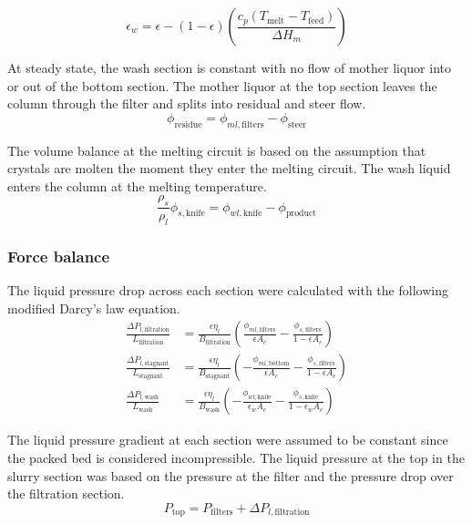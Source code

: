 \begin{equation}
\epsilon_{w}= \epsilon-(1-\epsilon)\left(\frac{c_p(T_{\mathrm{melt}}-T_{\mathrm{feed}})}{\Delta H_m}\right)
\end{equation}

At steady state, the wash section is constant with no flow of mother liquor into or out of the bottom section. The mother liquor at the top section leaves the column through the filter and splits into residual and steer flow. 
\begin{equation}
\phi_{\mathrm{residue}}= \phi_{ml,\mathrm{filters}} - \phi_{\mathrm{steer}}
\end{equation}

The volume balance at the melting circuit is based on the assumption that crystals are molten the moment they enter the melting circuit. The wash liquid enters the column at the melting temperature. 
\begin{equation}
\frac{\rho_s}{\rho_l}\phi_{s,\mathrm{knife}}= \phi_{wl,\mathrm{knife}} - \phi_{\mathrm{product}}
\end{equation}


\subsubsection{Force balance}
The liquid pressure drop across each section were calculated with the following modified Darcy's law equation. 
\begin{align}
    \frac{\Delta P_{l,\mathrm{filtration}}}{L_{\mathrm{filtration}}} &= \frac{\epsilon \eta_{l}}{B_{\mathrm{filtration}}}\left(\frac{\phi_{ml,\mathrm{filters}}}{\epsilon A_c} - \frac{\phi_{s,\mathrm{filters}}}{1-\epsilon A_c}\right) \\
    \frac{\Delta P_{l,\mathrm{stagnant}}}{L_{\mathrm{stagnant}}} &= \frac{\epsilon \eta_{l}}{B_{\mathrm{stagnant}}}\left(-\frac{\phi_{ml,\mathrm{bottom}}}{\epsilon A_c} - \frac{\phi_{s,\mathrm{filters}}}{1-\epsilon A_c}\right) \\
    \frac{\Delta P_{l,\mathrm{wash}}}{L_{\mathrm{wash}}} &= \frac{\epsilon \eta_{l}}{B_{\mathrm{wash}}}\left(-\frac{\phi_{wl,\mathrm{knife}}}{\epsilon_w A_c} - \frac{\phi_{s,\mathrm{knife}}}{1-\epsilon_w A_c}\right)
\end{align}

The liquid pressure gradient at each section were assumed to be constant since the packed bed is considered incompressible. The liquid pressure at the top in the slurry section was based on the pressure at the filter and the pressure drop over the filtration section. 
\begin{equation}
P_{\mathrm{top}} = P_{\mathrm{filters}} + \Delta P_{l,\mathrm{filtration}}
\end{equation}

